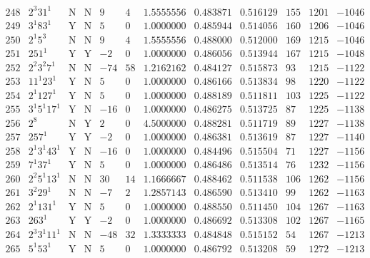 \documentclass[11pt,reqno,a4letter]{article}
\numberwithin{figure}{section}
\numberwithin{table}{section}
\theoremstyle{plain}
\numberwithin{theorem}{section}
\theoremstyle{definition}
\begin{document}
\begin{table}[ht]
\begin{equation*}
{\begin{array}{cc|cc|ccc|cc|ccc}
 248 & 2^3 31^1 & \text{N} & \text{N} & 9 & 4 & 1.5555556 & 0.483871 & 0.516129 & 155 & 1201 & -1046 \\
 249 & 3^1 83^1 & \text{Y} & \text{N} & 5 & 0 & 1.0000000 & 0.485944 & 0.514056 & 160 & 1206 & -1046 \\
 250 & 2^1 5^3 & \text{N} & \text{N} & 9 & 4 & 1.5555556 & 0.488000 & 0.512000 & 169 & 1215 & -1046 \\
 251 & 251^1 & \text{Y} & \text{Y} & -2 & 0 & 1.0000000 & 0.486056 & 0.513944 & 167 & 1215 & -1048 \\
 252 & 2^2 3^2 7^1 & \text{N} & \text{N} & -74 & 58 & 1.2162162 & 0.484127 & 0.515873 & 93 & 1215 & -1122 \\
 253 & 11^1 23^1 & \text{Y} & \text{N} & 5 & 0 & 1.0000000 & 0.486166 & 0.513834 & 98 & 1220 & -1122 \\
 254 & 2^1 127^1 & \text{Y} & \text{N} & 5 & 0 & 1.0000000 & 0.488189 & 0.511811 & 103 & 1225 & -1122 \\
 255 & 3^1 5^1 17^1 & \text{Y} & \text{N} & -16 & 0 & 1.0000000 & 0.486275 & 0.513725 & 87 & 1225 & -1138 \\
 256 & 2^8 & \text{N} & \text{Y} & 2 & 0 & 4.5000000 & 0.488281 & 0.511719 & 89 & 1227 & -1138 \\
 257 & 257^1 & \text{Y} & \text{Y} & -2 & 0 & 1.0000000 & 0.486381 & 0.513619 & 87 & 1227 & -1140 \\
 258 & 2^1 3^1 43^1 & \text{Y} & \text{N} & -16 & 0 & 1.0000000 & 0.484496 & 0.515504 & 71 & 1227 & -1156 \\
 259 & 7^1 37^1 & \text{Y} & \text{N} & 5 & 0 & 1.0000000 & 0.486486 & 0.513514 & 76 & 1232 & -1156 \\
 260 & 2^2 5^1 13^1 & \text{N} & \text{N} & 30 & 14 & 1.1666667 & 0.488462 & 0.511538 & 106 & 1262 & -1156 \\
 261 & 3^2 29^1 & \text{N} & \text{N} & -7 & 2 & 1.2857143 & 0.486590 & 0.513410 & 99 & 1262 & -1163 \\
 262 & 2^1 131^1 & \text{Y} & \text{N} & 5 & 0 & 1.0000000 & 0.488550 & 0.511450 & 104 & 1267 & -1163 \\
 263 & 263^1 & \text{Y} & \text{Y} & -2 & 0 & 1.0000000 & 0.486692 & 0.513308 & 102 & 1267 & -1165 \\
 264 & 2^3 3^1 11^1 & \text{N} & \text{N} & -48 & 32 & 1.3333333 & 0.484848 & 0.515152 & 54 & 1267 & -1213 \\
 265 & 5^1 53^1 & \text{Y} & \text{N} & 5 & 0 & 1.0000000 & 0.486792 & 0.513208 & 59 & 1272 & -1213 \\

\end{array}}
\end{equation*}
\end{table}
\end{document}
